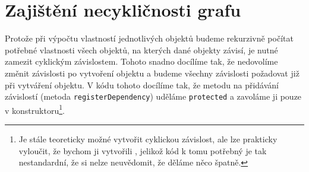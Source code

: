 \section[Necykličnost]{Zajištění necykličnosti grafu}
\label{sec:acyclicity}

Protože při výpočtu vlastností jednotlivých objektů budeme rekurzivně počítat potřebné vlastnosti všech objektů, na kterých dané objekty závisí, je nutné zamezit cyklickým závislostem.
Tohoto snadno docílíme tak, že nedovolíme změnit závislosti po vytvoření objektu a budeme všechny závislosti požadovat již při vytváření objektu.
V kódu tohoto docílíme tak, že metodu na přidávání závislostí (metoda \texttt{registerDependency}\cite[line 20-23]{geometryjs:source:geometryObjects:dependencyNode.ts}) uděláme \texttt{protected} a zavoláme ji pouze v konstruktoru\footnote{Je stále teoreticky možné vytvořit cyklickou závislost, ale lze prakticky vyloučit, že bychom ji vytvořili , jelikož kód k tomu potřebný je tak nestandardní, že si nelze neuvědomit, že děláme něco špatně.}.